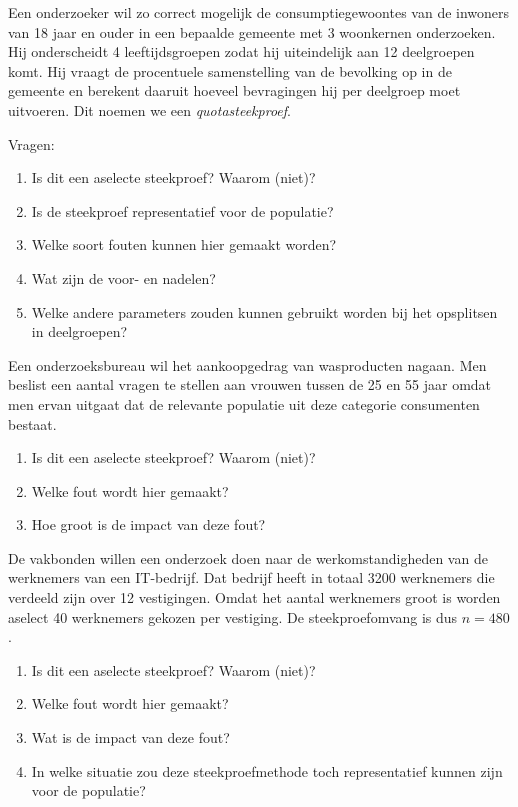\begin{exercise}
  Een onderzoeker wil zo correct mogelijk de consumptiegewoontes van de inwoners van 18 jaar en ouder in een bepaalde gemeente met 3 woonkernen onderzoeken.  Hij onderscheidt 4 leeftijdsgroepen zodat hij uiteindelijk aan 12 deelgroepen komt. Hij vraagt de procentuele samenstelling van de bevolking op in de gemeente en berekent daaruit hoeveel bevragingen hij per deelgroep moet uitvoeren. Dit noemen we een \emph{quotasteekproef}.
  
  Vragen:
  \begin{enumerate}[label=\alph*.]
    \item Is dit een aselecte steekproef? Waarom (niet)?
    \item Is de steekproef representatief voor de populatie?
    \item Welke soort fouten kunnen hier gemaakt worden?
    \item Wat zijn de voor- en nadelen?
    \item Welke andere parameters zouden kunnen gebruikt worden bij het opsplitsen in deelgroepen?
  \end{enumerate}
\end{exercise}

\begin{exercise}
  Een onderzoeksbureau wil het aankoopgedrag van wasproducten nagaan. Men beslist een aantal vragen te stellen aan vrouwen tussen de 25 en 55 jaar omdat men ervan uitgaat dat de relevante populatie uit deze categorie consumenten bestaat.
  
  \begin{enumerate}[label=\alph*.]
    \item Is dit een aselecte steekproef? Waarom (niet)?
    \item Welke fout wordt hier gemaakt?
    \item Hoe groot is de impact van deze fout?
  \end{enumerate}
\end{exercise}

\begin{exercise}
  De vakbonden willen een onderzoek doen naar de werkomstandigheden van de werknemers van een IT-bedrijf. Dat bedrijf heeft in totaal 3200 werknemers die verdeeld zijn over 12 vestigingen. Omdat het aantal werknemers groot is worden aselect 40 werknemers gekozen per vestiging. De steekproefomvang is dus $n = 480$.
  
  \begin{enumerate}[label=\alph*.]
    \item Is dit een aselecte steekproef? Waarom (niet)?
    \item Welke fout wordt hier gemaakt?
    \item Wat is de impact van deze fout?
    \item In welke situatie zou deze steekproefmethode toch representatief kunnen zijn voor de populatie?
  \end{enumerate}
\end{exercise}

